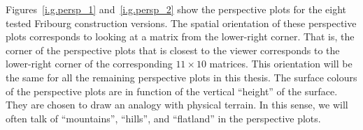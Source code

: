 Figures~\ref{i.g.persp_1} and~\ref{i.g.persp_2} show the perspective plots for the eight tested Fribourg construction versions. The spatial orientation of these perspective plots corresponds to looking at a matrix from the lower-right corner. That is, the corner of the perspective plots that is closest to the viewer corresponds to the lower-right corner of the corresponding $11 \times 10$ matrices. This orientation will be the same for all the remaining perspective plots in this thesis. The surface colours of the perspective plots are in function of the vertical ``height'' of the surface. They are chosen to draw an analogy with physical terrain. In this sense, we will often talk of ``mountains'', ``hills'', and ``flatland'' in the perspective plots.

\newcommand{\perspwidth}{0.475}

